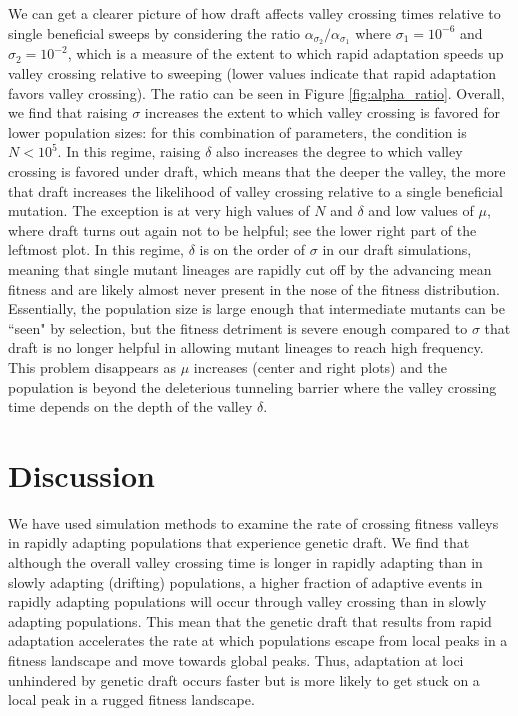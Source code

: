 \documentclass[rmp]{revtex4}
\begin{document}
\begin{spacing}{1.5}
We can get a clearer picture of how draft affects valley crossing times relative to single beneficial sweeps by considering the ratio $\alpha_{\sigma_2} / \alpha_{\sigma_1}$ where $\sigma_1=10^{-6}$ and $\sigma_2=10^{-2}$, which is a measure of the extent to which rapid adaptation speeds up valley crossing relative to sweeping (lower values indicate that rapid adaptation favors valley crossing).
The ratio can be seen in Figure \ref{fig:alpha_ratio}.
Overall, we find that raising $\sigma$ increases the extent to which valley crossing is favored for lower population sizes: for this combination of parameters, the condition is $N < 10^{5}$.
In this regime, raising $\delta$ also increases the degree to which valley crossing is favored under draft, which means that the deeper the valley, the more that draft increases the likelihood of valley crossing relative to a single beneficial mutation.
The exception is at very high values of $N$ and $\delta$ and low values of $\mu$, where draft turns out again not to be helpful; see the lower right part of the leftmost plot.
In this regime, $\delta$ is on the order of $\sigma$ in our draft simulations, meaning that single mutant lineages are rapidly cut off by the advancing mean fitness and are likely almost never present in the nose of the fitness distribution.
Essentially, the population size is large enough that intermediate mutants can be ``seen" by selection, but the fitness detriment is severe enough compared to $\sigma$ that draft is no longer helpful in allowing mutant lineages to reach high frequency.
This problem disappears as $\mu$ increases (center and right plots) and the population is beyond the deleterious tunneling barrier where the valley crossing time depends on the depth of the valley $\delta$.

\section{Discussion}

We have used simulation methods to examine the rate of crossing fitness valleys in rapidly adapting populations that experience genetic draft.
We find that although the overall valley crossing time is longer in rapidly adapting than in slowly adapting (drifting) populations, a higher fraction of adaptive events in rapidly adapting populations will occur through valley crossing than in slowly adapting populations.
This mean that the genetic draft that results from rapid adaptation accelerates the rate at which populations escape from local peaks in a fitness landscape and move towards global peaks.
Thus, adaptation at loci unhindered by genetic draft occurs faster but is more likely to get stuck on a local peak in a rugged fitness landscape.


\end{spacing}
\end{document}
